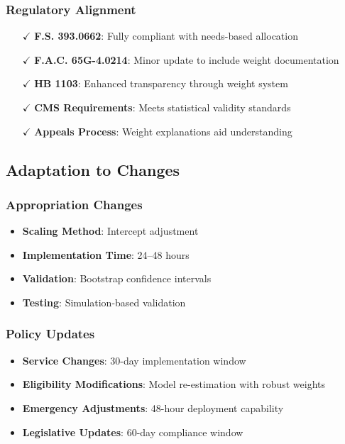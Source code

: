 \subsubsection{Regulatory Alignment}
\begin{itemize}
    \item[$\checkmark$] \textbf{F.S. 393.0662}: Fully compliant with needs-based allocation
    \item[$\checkmark$] \textbf{F.A.C. 65G-4.0214}: Minor update to include weight documentation
    \item[$\checkmark$] \textbf{HB 1103}: Enhanced transparency through weight system
    \item[$\checkmark$] \textbf{CMS Requirements}: Meets statistical validity standards
    \item[$\checkmark$] \textbf{Appeals Process}: Weight explanations aid understanding
\end{itemize}

\subsection{Adaptation to Changes}

\subsubsection{Appropriation Changes}
\begin{itemize}
    \item \textbf{Scaling Method}: Intercept adjustment
    \item \textbf{Implementation Time}: 24--48 hours
    \item \textbf{Validation}: Bootstrap confidence intervals
    \item \textbf{Testing}: Simulation-based validation
\end{itemize}

\subsubsection{Policy Updates}
\begin{itemize}
    \item \textbf{Service Changes}: 30-day implementation window
    \item \textbf{Eligibility Modifications}: Model re-estimation with robust weights
    \item \textbf{Emergency Adjustments}: 48-hour deployment capability
    \item \textbf{Legislative Updates}: 60-day compliance window
\end{itemize}

